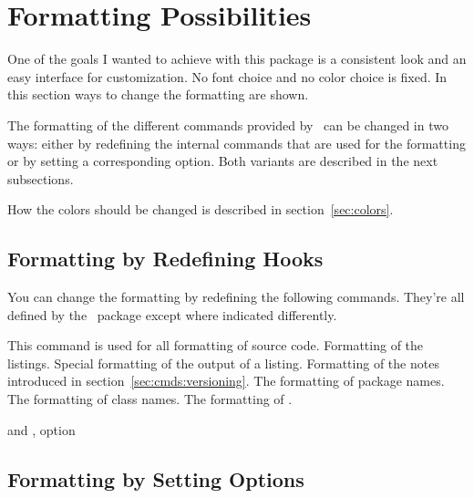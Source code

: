 \documentclass[load-preamble]{cnltx-doc}
\begin{document}
\section{Formatting Possibilities}\label{sec:cmds:formatting}

One of the goals I wanted to achieve with this package is a consistent look
and an easy interface for customization.  No font choice and no color choice
is fixed.  In this section ways to change the formatting are shown.

The formatting of the different commands provided by \cnltx\ can be
changed in two ways: either by redefining the internal commands that are used
for the formatting or by setting a corresponding option.  Both variants are
described in the next subsections.

How the colors should be changed is described in section~\ref{sec:colors}.

\subsection{Formatting by Redefining Hooks}

You can change the formatting by redefining the following commands.  They're
all defined by the \cnltxexample\ package except where indicated differently.

\begin{commands}
    This command is used for all formatting of source code.
    Formatting of the listings.
  \Default
    Special formatting of the output of a listing.
    \byclass Formatting of the notes introduced in section~\ref{sec:cmds:versioning}.
    The formatting of package names.
    The formatting of class names.
    The formatting of .
\end{commands}

\begin{example}
  \renewcommand*\codefont{\sffamily\bfseries}
   and , option 
\end{example}

\subsection{Formatting by Setting Options}
\end{document}
